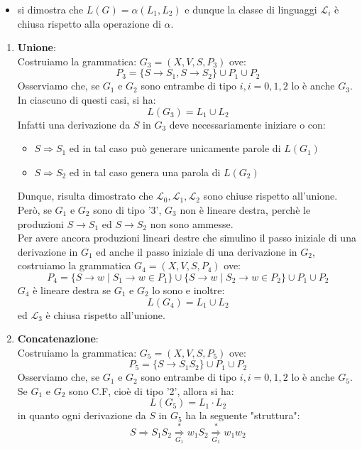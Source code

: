 \documentclass[12pt]{report}
\begin{document}
{{{\begin{itemize}
			\item si dimostra che $L(G) = \alpha(L_1, L_2)$ e dunque la classe di linguaggi $\mathcal{L}_i$ è chiusa rispetto alla operazione di $\alpha$.
		\end{itemize}
		\begin{enumerate}
			\item \textbf{Unione}: \\
			Costruiamo la grammatica: $G_3 = (X, V, S, P_3)$ ove:
			\[
			P_3 = \{S \to S_1, S \to S_2\} \cup P_1 \cup P_2
			\]
			Osserviamo che, se $G_1$ e $G_2$ sono entrambe di tipo $i, i = 0, 1, 2$ lo è anche $G_3$. In ciascuno di questi casi, si ha:
			\[
			L(G_3) = L_1 \cup L_2
			\]
			Infatti una derivazione da $S$ in $G_3$ deve necessariamente iniziare o con:
			\begin{itemize}
				\item $S \Rightarrow S_1$ ed in tal caso può generare unicamente parole di $L(G_1)$
				\item $S \Rightarrow S_2$ ed in tal caso genera una parola di $L(G_2)$
			\end{itemize}
			Dunque, risulta dimostrato che $\mathcal{L}_0, \mathcal{L}_1, \mathcal{L}_2$ sono chiuse rispetto all'unione. \\
			Però, se $G_1$ e $G_2$ sono di tipo '3', $G_3$ non è lineare destra, perchè le produzioni $S \to S_1$ ed $S \to S_2$ non sono ammesse. \\
			Per avere ancora produzioni lineari destre che simulino il passo iniziale di una derivazione in $G_1$ ed anche il passo iniziale di una derivazione in $G_2$, costruiamo la grammatica $G_4 = (X, V, S, P_4)$ ove:
			\[
			P_4 = \{S \to w \mid S_1 \to w \in P_1\} \cup \{S \to w \mid S_2 \to w \in P_2\} \cup P_1 \cup P_2
			\]
			$G_4$ è lineare destra se $G_1$ e $G_2$ lo sono e inoltre:
			\[
			L(G_4) = L_1 \cup L_2
			\]
			ed $\mathcal{L}_3$ è chiusa rispetto all'unione.
			\item \textbf{Concatenazione}: \\
			Costruiamo la grammatica: $G_5 = (X, V, S, P_5)$ ove:
			\[
			P_5 = \{S \to S_1S_2\} \cup P_1 \cup P_2
			\]
			Osserviamo che, se $G_1$ e $G_2$ sono entrambe di tipo $i, i = 0, 1, 2$ lo è anche $G_5$. \\
			Se $G_1$ e $G_2$ sono C.F, cioè di tipo '2', allora si ha:
			\[
			L(G_5) = L_1 \cdot L_2
			\]
			in quanto ogni derivazione da $S$ in $G_5$ ha la seguente "struttura":
			\[
			S \Rightarrow S_1S_2 \underset{G_1}{\overset{*}{\Rightarrow}} w_1S_2 \underset{G_1}{\overset{*}{\Rightarrow}} w_1w_2
\]
\end{enumerate}}}}
\end{document}
